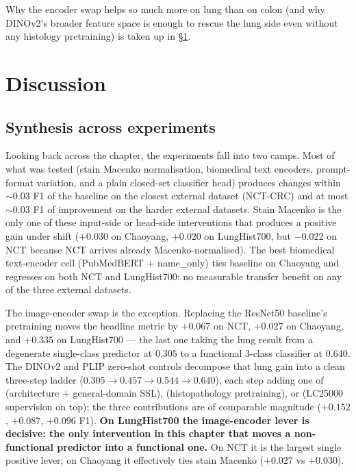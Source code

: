 Why the encoder swap helps so much more on lung than on colon (and why DINOv2's broader feature space is enough to rescue the lung side even without any histology pretraining) is taken up in §\ref{sec:results-discussion}.


\section{Discussion}
\label{sec:results-discussion}

\subsection{Synthesis across experiments}

Looking back across the chapter, the experiments fall into two camps. Most of what was tested (stain Macenko normalisation, biomedical text encoders, prompt-format variation, and a plain closed-set classifier head) produces changes within $\sim 0.03$ F1 of the baseline on the closest external dataset (NCT-CRC) and at most $\sim 0.03$ F1 of improvement on the harder external datasets. Stain Macenko is the only one of these input-side or head-side interventions that produces a positive gain under shift ($+0.030$ on Chaoyang, $+0.020$ on LungHist700, but $-0.022$ on NCT because NCT arrives already Macenko-normalised). The best biomedical text-encoder cell (PubMedBERT + name\_only) ties baseline on Chaoyang and regresses on both NCT and LungHist700: no measurable transfer benefit on any of the three external datasets.

The image-encoder swap is the exception. Replacing the ResNet50 baseline's pretraining moves the headline metric by $+0.067$ on NCT, $+0.027$ on Chaoyang, and $+0.335$ on LungHist700 --- the last one taking the lung result from a degenerate single-class predictor at $0.305$ to a functional 3-class classifier at $0.640$. The DINOv2 and PLIP zero-shot controls decompose that lung gain into a clean three-step ladder ($0.305 \to 0.457 \to 0.544 \to 0.640$), each step adding one of (architecture + general-domain SSL), (histopathology pretraining), or (LC25000 supervision on top); the three contributions are of comparable magnitude ($+0.152$, $+0.087$, $+0.096$ F1). \textbf{On LungHist700 the image-encoder lever is decisive: the only intervention in this chapter that moves a non-functional predictor into a functional one.} On NCT it is the largest single positive lever; on Chaoyang it effectively ties stain Macenko ($+0.027$ vs $+0.030$).

